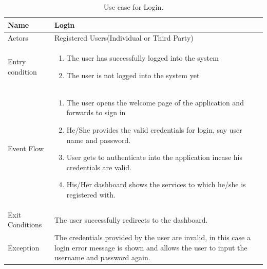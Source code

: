 \begin{table}[H]
\begin{center}
\begin{tabular}{| l | p{} |}
\hline
Name & Login \\
\hline
Actors & Registered Users(Individual or Third Party)
\\
\hline
Entry condition & \begin{enumerate}
\item The user has successfully logged into the system
\item The user is not logged into the system yet
\end{enumerate}  \\
\hline
Event Flow & \begin{enumerate}
	\item The user opens the welcome page of the application and forwards to sign in
	\item He/She provides the valid credentials for login, say user name and password.
	\item User gets to authenticate into the application incase his credentials are valid.
    \item His/Her dashboard shows the services to which he/she is registered with.
	
\end{enumerate}
\\
\hline
Exit Conditions & The user successfully redirects to the dashboard. \\
\hline
Exception & 
The credentials provided by the user are invalid, in this case a login error message is shown and allows the user to input the username and password again.\\
\hline
\end{tabular}
\end{center}
\caption{Use case for Login.}
\label{usecase-login}
\end{table}



